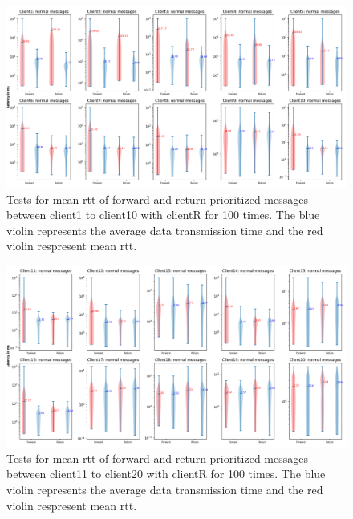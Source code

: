 \begin{figure}
    \centering
    \includegraphics[width=\textheight]{figures/appendix/priority_tests/log_violin_50clients_figure_1.png}\hfill 
    \caption{Tests for mean \gls{rtt} of forward and return prioritized messages between client1 to client10 
    with clientR for 100 times. The blue violin represents the average data transmission time and the red violin 
    respresent mean \gls{rtt}.} \label{fig: priority-50clients-a}
\end{figure}

\begin{figure}
    \includegraphics[width=\textheight]{figures/appendix/priority_tests/log_violin_50clients_figure_2.png}\hfill 
    \caption{Tests for mean \gls{rtt} of forward and return prioritized messages between client11 to client20 
    with clientR for 100 times. The blue violin represents the average data transmission time and the red violin 
    respresent mean \gls{rtt}.} \label{fig: priority-50clients-b}
\end{figure}


